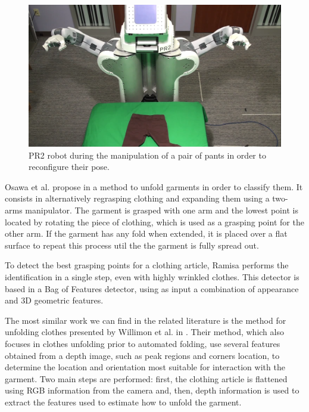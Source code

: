 \begin{figure}[thpb]
    \centering
    \includegraphics[width=\textwidth]{figures/SOTA_Cusumano_PR2.png}
    \caption{PR2 robot during the manipulation of a pair of pants in order to reconfigure their pose. }
    \label{fig:SOTA_Cusumano_2011}
\end{figure}

Osawa et al. propose in \cite{Osawa2006} a method to unfold garments in order to classify them. It consists in alternatively regrasping clothing and expanding them using a two-arms manipulator. The garment is grasped with one arm and the lowest point is located by rotating the piece of clothing, which is used as a grasping point for the other arm. If the garment has any fold when extended, it is placed over a flat surface to repeat this process util the the garment is fully spread out.

To detect the best grasping points for a clothing article, Ramisa \cite{Ramisa2012} performs the identification in a single step, even with highly wrinkled clothes. This detector is based in a Bag of Features detector, using as input a combination of appearance and 3D geometric features.

The most similar work we can find in the related literature is the method for unfolding clothes presented by Willimon et al. in \cite{Willimon2011}. Their method, which also focuses in clothes unfolding prior to automated folding, use several features obtained from a depth image, such as peak regions and corners location, to determine the location and orientation most suitable for interaction with the garment. Two main steps are performed: first, the clothing article is flattened using RGB information from the camera and, then, depth information is used to extract the features used to estimate how to unfold the garment.

